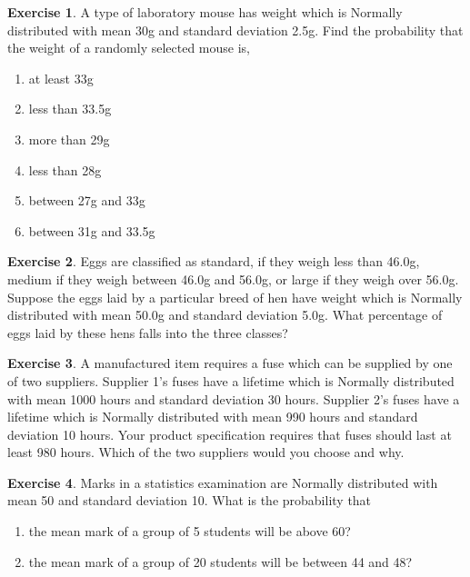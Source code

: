 \documentclass[
]{book}
\theoremstyle{definition}
\theoremstyle{definition}
\theoremstyle{definition}
\newtheorem{exercise}{Exercise}[chapter]
\theoremstyle{definition}
\theoremstyle{remark}
\begin{document}
\begin{exercise}

A type of laboratory mouse has weight which is Normally distributed with mean
30g and standard deviation 2.5g. Find the probability that the weight of a randomly
selected mouse is,

\begin{enumerate}
\def\labelenumi{\alph{enumi}.}
\item
  at least 33g
\item
  less than 33.5g
\item
  more than 29g
\item
  less than 28g
\item
  between 27g and 33g
\item
  between 31g and 33.5g
\end{enumerate}

\end{exercise}

\begin{exercise}
Eggs are classified as standard, if they weigh less than
46.0g, medium if they weigh between 46.0g and 56.0g, or large if
they weigh over 56.0g. Suppose the eggs laid by a particular
breed of hen have weight which is Normally distributed with mean
50.0g and standard deviation 5.0g. What percentage of eggs laid by
these hens falls into the three classes?
\end{exercise}

\begin{exercise}
A manufactured item requires a fuse which can be supplied by one
of two suppliers. Supplier 1's fuses have a lifetime which is Normally distributed
with mean 1000 hours and standard deviation 30 hours. Supplier 2's fuses have a
lifetime which is Normally distributed with mean 990 hours and standard deviation
10 hours. Your product specification requires that fuses should last at least 980
hours. Which of the two suppliers would you choose and why.
\end{exercise}

\begin{exercise}

Marks in a statistics examination are Normally
distributed with mean 50 and standard deviation 10. What is the
probability that

\begin{enumerate}
\def\labelenumi{\roman{enumi})}
\item
  the mean mark of a group of 5 students will be above 60?
\item
  the mean mark of a group of 20 students will be between 44
  and 48?
\end{enumerate}

\end{exercise}
\end{document}
